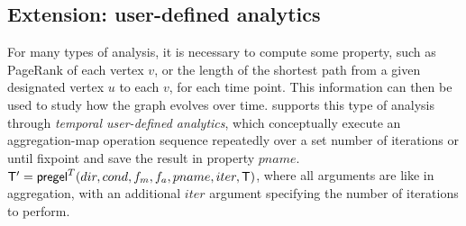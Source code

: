 \subsection{Extension: user-defined analytics}
\label{sec:analytics}

For many types of analysis, it is necessary to compute some property,
such as PageRank of each vertex $v$, or the length of the shortest
path from a given designated vertex $u$ to each $v$, for each time
point.  This information can then be used to study how the graph
evolves over time.  \ql supports this type of analysis through {\em
  temporal user-defined analytics}, which conceptually execute an
aggregation-map operation sequence repeatedly over a set number of
iterations or until fixpoint and save the result in property $pname$.
$\mathsf{T}' = \textsf{pregel}^T (dir,cond,f_m,f_a,pname,iter,\mathsf{T})$, where
all arguments are like in aggregation, with an additional $iter$
argument specifying the number of iterations to perform.



  
